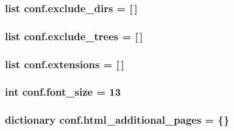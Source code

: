 \subsubsection[{exclude\+\_\+dirs}]{\setlength{\rightskip}{0pt plus 5cm}list conf.\+exclude\+\_\+dirs = \mbox{[}$\,$\mbox{]}}\label{namespaceconf_a423709e8d7f8b9c3b34e88e40550e8ba}
\hypertarget{namespaceconf_aa8a9845f7e0bc1a109b463c6efe6db86}{}
\subsubsection[{exclude\+\_\+trees}]{\setlength{\rightskip}{0pt plus 5cm}list conf.\+exclude\+\_\+trees = \mbox{[}$\,$\mbox{]}}\label{namespaceconf_aa8a9845f7e0bc1a109b463c6efe6db86}
\hypertarget{namespaceconf_a540efa67c53e84c1c353c1df2e37e39c}{}
\subsubsection[{extensions}]{\setlength{\rightskip}{0pt plus 5cm}list conf.\+extensions = \mbox{[}$\,$\mbox{]}}\label{namespaceconf_a540efa67c53e84c1c353c1df2e37e39c}
\hypertarget{namespaceconf_a8513964f1baeeec66f3f3df07d05759c}{}
\subsubsection[{font\+\_\+size}]{\setlength{\rightskip}{0pt plus 5cm}int conf.\+font\+\_\+size = 13}\label{namespaceconf_a8513964f1baeeec66f3f3df07d05759c}
\hypertarget{namespaceconf_a3829515111ba6a7fd25627567430b0e5}{}
\subsubsection[{html\+\_\+additional\+\_\+pages}]{\setlength{\rightskip}{0pt plus 5cm}dictionary conf.\+html\+\_\+additional\+\_\+pages = \{\}}\label{namespaceconf_a3829515111ba6a7fd25627567430b0e5}
\hypertarget{namespaceconf_a771fe07e57b9dde77561c2dcb1f16204}{}
